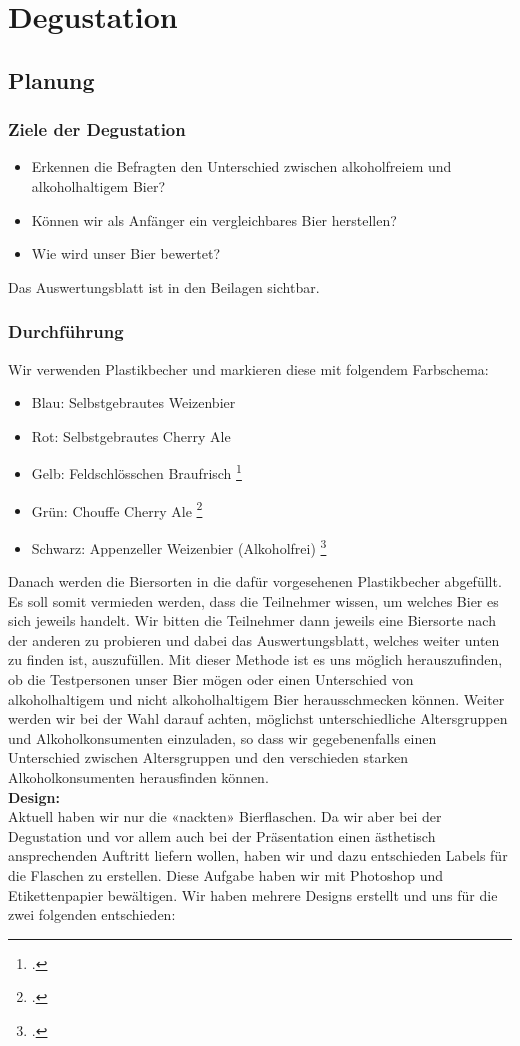 \newpage
\section{Degustation}
\subsection{Planung}
\subsubsection{Ziele der Degustation}
\begin{itemize}
    \item Erkennen die Befragten den Unterschied zwischen alkoholfreiem und alkoholhaltigem Bier?
    \item Können wir als Anfänger ein vergleichbares Bier herstellen?
    \item Wie wird unser Bier bewertet?
\end{itemize}
Das Auswertungsblatt ist in den Beilagen sichtbar.
\subsubsection{Durchführung}
Wir verwenden Plastikbecher und markieren diese mit folgendem Farbschema:
\begin{itemize}
    \item Blau: 	Selbstgebrautes Weizenbier
    \item Rot:		Selbstgebrautes Cherry Ale
    \item Gelb: 	Feldschlösschen Braufrisch \footcite[Internet shop - Braufrisch Bier 6 x 0.5 l]{brack}
    \item Grün:		Chouffe Cherry Ale \footcite[CHOUFFE Cherry]{Manor}
    \item Schwarz:	Appenzeller Weizenbier (Alkoholfrei) \footcite[Appenzeller Bier Sonnenwendlig alkoholfrei]{Coop}
\end{itemize}

Danach werden die Biersorten in die dafür vorgesehenen Plastikbecher abgefüllt. Es soll somit vermieden werden, dass die Teilnehmer wissen, um welches Bier es sich jeweils handelt.
Wir bitten die Teilnehmer dann jeweils eine Biersorte nach der anderen zu probieren und dabei das Auswertungsblatt, welches weiter unten zu finden ist, auszufüllen. Mit dieser Methode ist es uns möglich herauszufinden, ob die Testpersonen unser Bier mögen oder einen Unterschied von alkoholhaltigem und nicht alkoholhaltigem Bier herausschmecken können. Weiter werden wir bei der Wahl darauf achten, möglichst unterschiedliche Altersgruppen und Alkoholkonsumenten einzuladen, so dass wir gegebenenfalls einen Unterschied zwischen Altersgruppen und den verschieden starken Alkoholkonsumenten herausfinden können.
\\\newpage
\textbf{Design:}\\
Aktuell haben wir nur die «nackten» Bierflaschen. Da wir aber bei der Degustation und vor allem auch bei der Präsentation einen ästhetisch ansprechenden Auftritt liefern wollen, haben wir und dazu entschieden Labels für die Flaschen zu erstellen. Diese Aufgabe haben wir mit Photoshop und Etikettenpapier bewältigen. Wir haben mehrere Designs erstellt und uns für die zwei folgenden entschieden:

